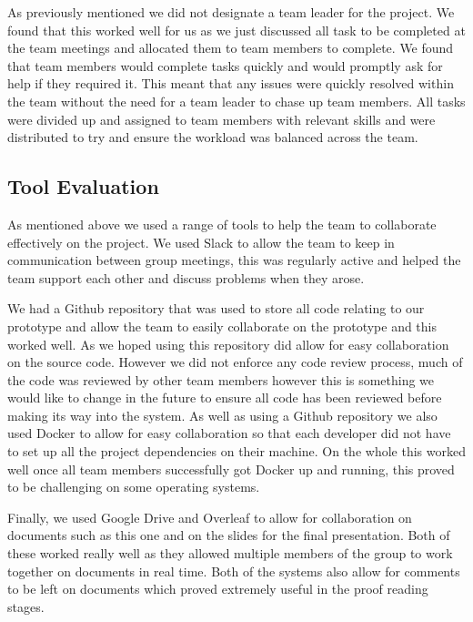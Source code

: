 As previously mentioned we did not designate a team leader for the project. We found that this worked well for us as we just discussed all task to be completed at the team meetings and allocated them to team members to complete. We found that team members would complete tasks quickly and would promptly ask for help if they required it. This meant that any issues were quickly resolved within the team without the need for a team leader to chase up team members. All tasks were divided up and assigned to team members with relevant skills and were distributed to try and ensure the workload was balanced across the team.

\subsection{Tool Evaluation}

As mentioned above we used a range of tools to help the team to collaborate effectively on the project. We used Slack \cite{slack} to allow the team to keep in communication between group meetings, this was regularly active and helped the team support each other and discuss problems when they arose. 

We had a Github \cite{github} repository that was used to store all code relating to our prototype and allow the team to easily collaborate on the prototype and this worked well. As we hoped using this repository did allow for easy collaboration on the source code. However we did not enforce any code review process, much of the code was reviewed by other team members however this is something we would like to change in the future to ensure all code has been reviewed before making its way into the system. As well as using a Github repository we also used Docker \cite{docker} to allow for easy collaboration so that each developer did not have to set up all the project dependencies on their machine. On the whole this worked well once all team members successfully got Docker up and running, this proved to be challenging on some operating systems.

Finally, we used Google Drive \cite{googledrive} and Overleaf \cite{overleaf} to allow for collaboration on documents such as this one and on the slides for the final presentation. Both of these worked really well as they allowed multiple members of the group to work together on documents in real time. Both of the systems also allow for comments to be left on documents which proved extremely useful in the proof reading stages.

